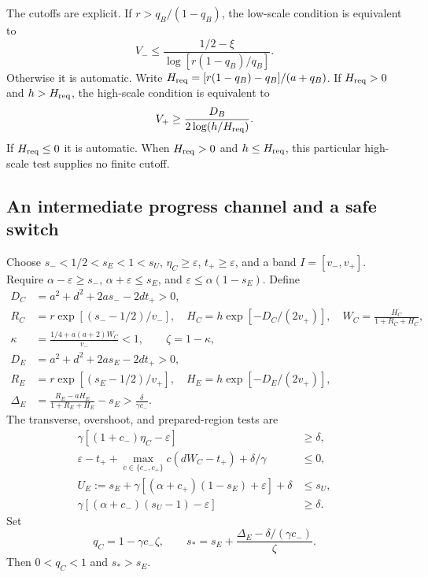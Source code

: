 The cutoffs are explicit. If $r>q_B/(1-q_B)$, the low-scale condition is
equivalent to
\begin{equation}\label{geo:eq:lowcut}
 V_-\le\frac{1/2-\xi}{\log[r(1-q_B)/q_B]}.
\end{equation}
Otherwise it is automatic. Write
$H_{\rm req}=[r(1-q_B)-q_B]/(a+q_B)$. If $H_{\rm req}>0$ and $h>H_{\rm req}$,
the high-scale condition is equivalent to
\begin{equation}\label{geo:eq:highcut}
 V_+\ge\frac{D_B}{2\log(h/H_{\rm req})}.
\end{equation}
If $H_{\rm req}\le0$ it is automatic. When $H_{\rm req}>0$ and
$h\le H_{\rm req}$, this particular high-scale test supplies no finite cutoff.

\subsection{An intermediate progress channel and a safe switch}
Choose $s_-<1/2<s_E<1<s_U$, $\eta_C\ge\varepsilon$, $t_+\ge\varepsilon$, and a band
$I=[v_-,v_+]$. Require $\alpha-\varepsilon\ge s_-$, $\alpha+\varepsilon\le s_E$, and
$\varepsilon\le\alpha(1-s_E)$. Define
\begin{align}
 D_C&=a^2+d^2+2as_--2dt_+>0,\nonumber\\
 R_C&=r\exp[(s_--1/2)/v_-],\quad
 H_C=h\exp[-D_C/(2v_+)],\quad
 W_C=\frac{H_C}{1+R_C+H_C},\label{geo:eq:WC}\\
 \kappa&=\frac{1/4+a(a+2)W_C}{v_-}<1,\qquad\zeta=1-\kappa,\label{geo:eq:kappa}\\
 D_E&=a^2+d^2+2as_E-2dt_+>0,\nonumber\\
 R_E&=r\exp[(s_E-1/2)/v_+],\quad H_E=h\exp[-D_E/(2v_+)],\nonumber\\
 \Delta_E&=\frac{R_E-aH_E}{1+R_E+H_E}-s_E>\frac{\delta}{\gamma c_-}.
 \label{geo:eq:surplus}
\end{align}
The transverse, overshoot, and prepared-region tests are
\begin{align}
 \gamma[(1+c_-)\eta_C-\varepsilon]&\ge\delta,\label{geo:eq:Cbottom}\\
 \varepsilon-t_++\max_{c\in\{c_-,c_+\}}c(dW_C-t_+)+\delta/\gamma&\le0,\label{geo:eq:Ctop}\\
 U_E:=s_E+\gamma[(\alpha+c_+)(1-s_E)+\varepsilon]+\delta&\le s_U,\label{geo:eq:exit}\\
 \gamma[(\alpha+c_-)(s_U-1)-\varepsilon]&\ge\delta.\label{geo:eq:right}
\end{align}
Set
\begin{equation}\label{geo:eq:comparison}
 q_C=1-\gamma c_-\zeta,\qquad
 s_*=s_E+\frac{\Delta_E-\delta/(\gamma c_-)}{\zeta}.
\end{equation}
Then $0<q_C<1$ and $s_*>s_E$.

